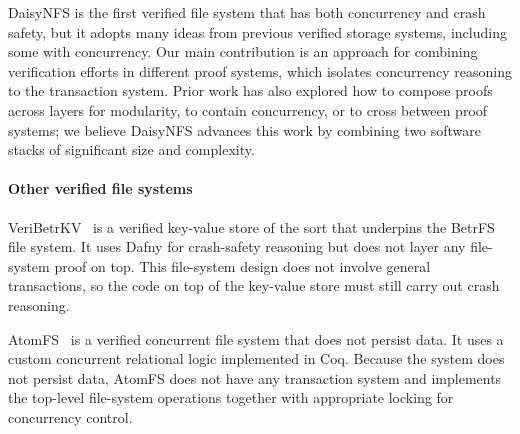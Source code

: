 DaisyNFS is the first verified file system that has both concurrency and crash
safety, but it adopts many ideas from previous verified storage systems,
including some with concurrency. Our main contribution is an approach for
combining verification efforts in different proof systems, which isolates
concurrency reasoning to the transaction system. Prior work has also explored
how to compose proofs across layers for modularity, to contain concurrency, or
to cross between proof systems; we believe DaisyNFS advances this work by combining
two software stacks of significant size and complexity.

\paragraph{Other verified file systems}



VeriBetrKV~\cite{hance:veribetrkv} is a verified key-value store of
the sort that underpins the BetrFS~\cite{jannen:betrfs} file system. It uses Dafny for
crash-safety reasoning but does not layer any file-system proof on
top. This file-system design does not involve general transactions, so
the code on top of the key-value store must still carry out crash
reasoning.

AtomFS~\cite{zou:atomfs} is a verified concurrent file system that
does not persist data. It uses a custom concurrent relational logic
implemented in Coq.  Because the system does not persist data, AtomFS
does not have any transaction system and implements the top-level
file-system operations together with appropriate locking for
concurrency control.


